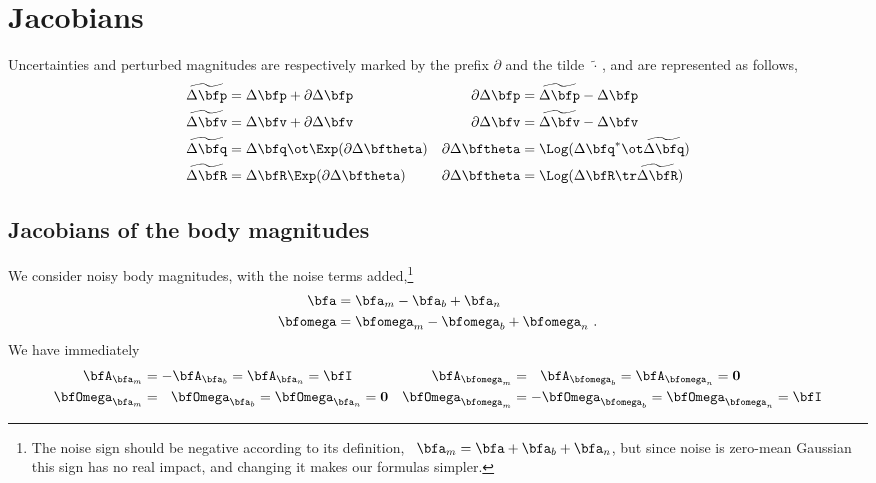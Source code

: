 %



\newpage
\section{Jacobians}

Uncertainties and perturbed magnitudes are respectively marked by the prefix $\partial$ and the tilde\, $\widetilde\cdot$\,, and are represented as follows,
%
\begin{align*}
\widetilde\Dp &= \Dp + \partial\Dp & \partial\Dp &= \widetilde\Dp-\Dp \\
\widetilde\Dv &= \Dv + \partial\Dv & \partial\Dv &= \widetilde\Dv-\Dv \\
\widetilde\Dq &= \Dq \ot \Exp( \partial\Dth ) & \partial\Dth &= \Log(\Dq^*\ot\widetilde\Dq) \\
\widetilde\DR &= \DR  \Exp( \partial\Dth ) & \partial\Dth &= \Log(\DR\tr\widetilde\DR) 
\end{align*}


\subsection{Jacobians of the body magnitudes}

We consider noisy body magnitudes, with the noise terms added,\footnote{The noise sign should be negative according to its definition, \eg~$\bfa_m = \bfa+\ab+\bfa_n$, but since noise is zero-mean Gaussian this sign has no real impact, and changing it makes our formulas simpler.}
%
\begin{align*}
\bfa &= \bfa_m - \ab + \bfa_n \\
\bw &= \bw_m - \wb + \bw_n 
~.
\end{align*}
%
We have immediately
%
\begin{align*}
\bfA_{\bfa_m} 
  &= -\bfA_{\bfa_b} = \bfA_{\bfa_n} = \bfI 
& \bfA_{\bw_m} 
  &= ~~\bfA_{\bw_b} = \bfA_{\bw_n} = \bf0 \\
\bfOmega_{\bfa_m} 
  &= ~~\bfOmega_{\bfa_b} = \bfOmega_{\bfa_n} = \bf0 
& \bfOmega_{\bw_m} 
  &= -\bfOmega_{\bw_b} = \bfOmega_{\bw_n} = \bfI 
\end{align*}



